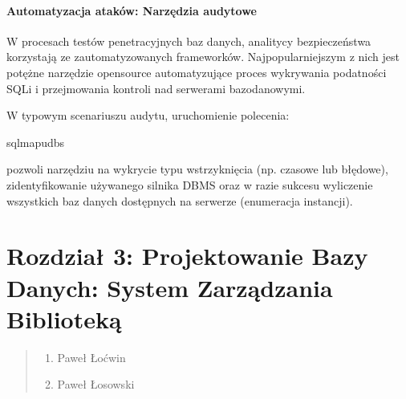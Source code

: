 \documentclass[letterpaper,10pt,english]{sphinxmanual}
\begin{document}
\subsubsection{Automatyzacja ataków: Narzędzia audytowe}
\label{\detokenize{rozdzial_2/rozdzial_27/rozdzial_2:automatyzacja-atakow-narzedzia-audytowe}}
\sphinxAtStartPar
W procesach testów penetracyjnych baz danych, analitycy bezpieczeństwa korzystają ze zautomatyzowanych frameworków. Najpopularniejszym z nich jest  \textendash{} potężne narzędzie open\sphinxhyphen{}source automatyzujące proces wykrywania podatności SQLi i przejmowania kontroli nad serwerami bazodanowymi.

\sphinxAtStartPar
W typowym scenariuszu audytu, uruchomienie polecenia:

\begin{sphinxVerbatim}[commandchars=\\\{\}]
sqlmap\PYGZhy{}u\PYGZhy{}\PYGZhy{}dbs
\end{sphinxVerbatim}

\sphinxAtStartPar
pozwoli narzędziu na wykrycie typu wstrzyknięcia (np. czasowe lub błędowe), zidentyfikowanie używanego silnika DBMS oraz \textendash{} w razie sukcesu \textendash{} wyliczenie wszystkich baz danych dostępnych na serwerze (enumeracja instancji).

\sphinxstepscope


\chapter{Rozdział 3: Projektowanie Bazy Danych: System Zarządzania Biblioteką}
\label{\detokenize{rozdzial_3/index:rozdzial-3-projektowanie-bazy-danych-system-zarzadzania-biblioteka}}\label{\detokenize{rozdzial_3/index::doc}}\begin{quote}\begin{description}
\begin{enumerate}
%
\item {} 
\sphinxAtStartPar
Paweł Łoćwin

\item {} 
\sphinxAtStartPar
Paweł Łosowski

\end{enumerate}

\end{description}\end{quote}
\end{document}
